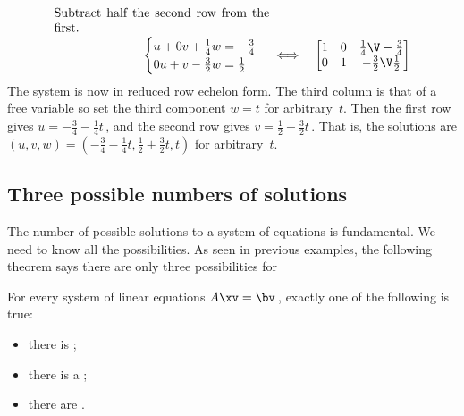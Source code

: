 \begin{example}
\begin{solution}
\begin{eqnarray*}
\\
\parbox{0.5\linewidth}{Subtract half the second row from the first.}
\\
\begin{cases}
u+0v+\frac14w=-\frac34\\0u+v-\frac32w=\frac12
\end{cases}
&\iff&%
\begin{bmatrix} 1&0&\frac14\V-\frac34\\0&1&-\frac32\V\frac12 \end{bmatrix}
\end{eqnarray*}
The system is now in reduced row echelon form.  
The third column is that of a free variable so set the third component \(w=t\) for arbitrary~\(t\).
Then the first row gives \(u=-\frac34-\frac14t\)\,, and the second row gives \(v=\frac12+\frac32t\)\,.
That is, the solutions are \((u,v,w)=(-\frac34-\frac14t,\frac12+\frac32t,t)\) for arbitrary~\(t\).
\end{solution}
\end{example}




\subsection{Three possible numbers of solutions}
\label{sec:3pns}

The number of possible solutions to a system of equations is fundamental.  
We need to know all the possibilities.
As seen in previous examples, the following theorem says there are only three possibilities for 

\begin{theorem} \label{thm:fred}
For every system of linear equations \(A\xv=\bv\)\,, exactly one of the following is true:
\begin{itemize}
\item there is ;
\item there is a ;
\item there are .
\end{itemize}
\end{theorem}

\begin{comment}
After studying \cref{sec:svdsgs}, this theorem could alternatively be proved directly from the use of the so-called \idx{singular value decomposition} in solving the linear equation \(A\xv=\bv\)\,.
\end{comment}

